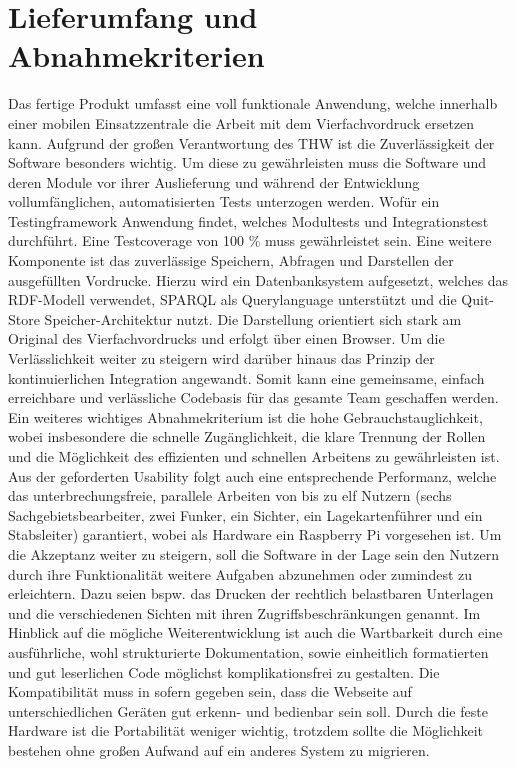 \section{Lieferumfang und Abnahmekriterien}
Das fertige Produkt umfasst eine voll funktionale Anwendung, welche innerhalb einer mobilen Einsatzzentrale die Arbeit mit dem Vierfachvordruck ersetzen kann. Aufgrund der großen Verantwortung des THW ist die Zuverlässigkeit der Software besonders wichtig. Um diese zu gewährleisten muss die Software und deren Module vor ihrer Auslieferung und während der Entwicklung vollumfänglichen, automatisierten Tests unterzogen werden. Wofür ein Testingframework Anwendung findet, welches Modultests und Integrationstest durchführt. Eine Testcoverage von 100 \% muss gewährleistet sein. Eine weitere Komponente ist das zuverlässige Speichern, Abfragen und Darstellen der ausgefüllten Vordrucke. Hierzu wird ein Datenbanksystem aufgesetzt, welches das RDF-Modell verwendet, SPARQL als Querylanguage unterstützt und die Quit-Store Speicher-Architektur nutzt. Die Darstellung orientiert sich stark am Original des Vierfachvordrucks und erfolgt über einen Browser. Um die Verlässlichkeit weiter zu steigern wird darüber hinaus das Prinzip der kontinuierlichen Integration angewandt. Somit kann eine gemeinsame, einfach erreichbare und verlässliche Codebasis für das gesamte Team geschaffen werden. Ein weiteres wichtiges Abnahmekriterium ist die hohe Gebrauchstauglichkeit, wobei insbesondere die schnelle Zugänglichkeit, die klare Trennung der Rollen und die Möglichkeit des effizienten und schnellen Arbeitens zu gewährleisten ist. Aus der geforderten Usability folgt auch eine entsprechende Performanz, welche das unterbrechungsfreie, parallele Arbeiten von bis zu elf Nutzern (sechs Sachgebietsbearbeiter, zwei Funker, ein Sichter, ein Lagekartenführer und ein Stabsleiter) garantiert, wobei als Hardware ein Raspberry Pi vorgesehen ist. Um die Akzeptanz weiter zu steigern, soll die Software in der Lage sein den Nutzern durch ihre Funktionalität weitere Aufgaben abzunehmen oder zumindest zu erleichtern. Dazu seien bspw. das Drucken der rechtlich belastbaren Unterlagen und die verschiedenen Sichten mit ihren Zugriffsbeschränkungen genannt. Im Hinblick auf die mögliche Weiterentwicklung ist auch die Wartbarkeit durch eine ausführliche, wohl strukturierte Dokumentation, sowie einheitlich formatierten und gut leserlichen Code möglichst komplikationsfrei zu gestalten. Die Kompatibilität muss in sofern gegeben sein, dass die Webseite auf unterschiedlichen Geräten gut erkenn- und bedienbar sein soll. Durch die feste Hardware ist die Portabilität weniger wichtig, trotzdem sollte die Möglichkeit bestehen ohne großen Aufwand auf ein anderes System zu migrieren. 